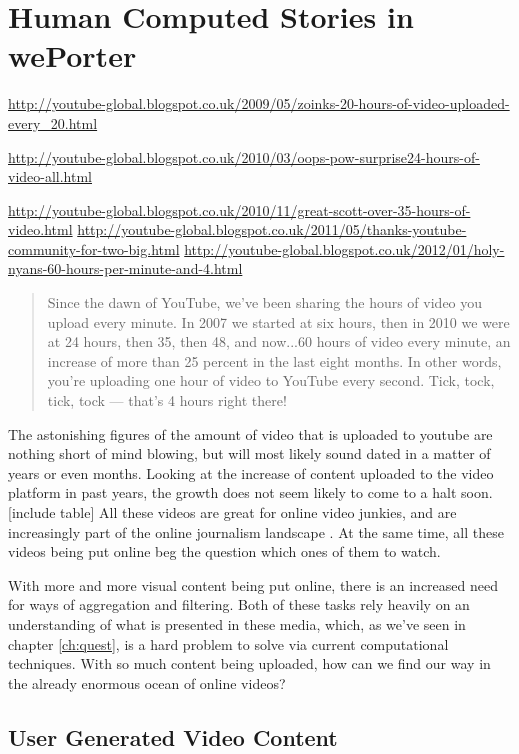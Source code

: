 \chapter{Human Computed Stories in wePorter}
\label{chap:weporter}

\url{http://youtube-global.blogspot.co.uk/2009/05/zoinks-20-hours-of-video-uploaded-every_20.html}

\url{http://youtube-global.blogspot.co.uk/2010/03/oops-pow-surprise24-hours-of-video-all.html}

\url{http://youtube-global.blogspot.co.uk/2010/11/great-scott-over-35-hours-of-video.html}
\url{http://youtube-global.blogspot.co.uk/2011/05/thanks-youtube-community-for-two-big.html}
\url{http://youtube-global.blogspot.co.uk/2012/01/holy-nyans-60-hours-per-minute-and-4.html}

\begin{quote}
  Since the dawn of YouTube, we’ve been sharing the hours of video you upload every minute. In 2007 we started at six hours, then in 2010 we were at 24 hours, then 35, then 48, and now...60 hours of video every minute, an increase of more than 25 percent in the last eight months. In other words, you’re uploading one hour of video to YouTube every second. Tick, tock, tick, tock — that’s 4 hours right there!
\end{quote}

The astonishing figures of the amount of video that is uploaded to youtube are nothing short of mind blowing, but will most likely sound dated in a matter of years or even months. Looking at the increase of content uploaded to the video platform in past years, the growth does not seem likely to come to a halt soon. [include table] All these videos are great for online video junkies, and are increasingly part of the online journalism landscape \cite{Rosenstiel:2012vb}. At the same time, all these videos being put online beg the question which ones of them to watch.

With more and more visual content being put online, there is an increased need for ways of aggregation and filtering. Both of these tasks rely heavily on an understanding of what is presented in these media, which, as we've seen in chapter \ref{ch:quest}, is a hard problem to solve via current computational techniques. With so much content being uploaded, how can we find our way in the already enormous ocean of online videos?

\section{User Generated Video Content}

